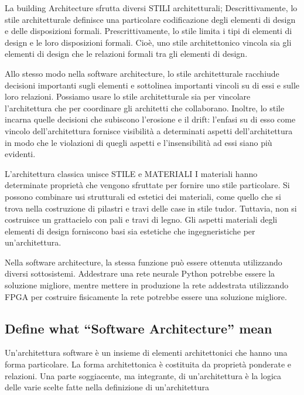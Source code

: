 \documentclass{article}
\begin{document}
La building Architecture sfrutta diversi STILI architetturali;
Descrittivamente, lo stile architetturale definisce una particolare codificazione degli elementi di design e delle disposizioni formali.
Prescrittivamente, lo stile limita i tipi di elementi di design e le loro disposizioni formali.
Cioè, uno stile architettonico vincola sia gli elementi di design che le relazioni formali tra gli elementi di design.

Allo stesso modo nella software architecture, lo stile architetturale racchiude decisioni importanti sugli elementi e sottolinea importanti vincoli su di essi e sulle loro relazioni.
Possiamo usare lo stile architetturale sia per vincolare l'architettura che per coordinare gli architetti che collaborano.
Inoltre, lo stile incarna quelle decisioni che subiscono l'erosione e il drift: l'enfasi su di esso come vincolo dell'architettura fornisce visibilità a determinati aspetti dell'architettura in modo che le violazioni di quegli aspetti e l'insensibilità ad essi siano più evidenti.

L'architettura classica unisce STILE e MATERIALI
I materiali hanno determinate proprietà che vengono sfruttate per fornire uno stile particolare. Si possono combinare usi strutturali ed estetici dei materiali, come quello che si trova nella costruzione di pilastri e travi delle case in stile tudor.
Tuttavia, non si costruisce un grattacielo con pali e travi di legno.
Gli aspetti materiali degli elementi di design forniscono basi sia estetiche che ingegneristiche per un'architettura.

Nella software architecture, la stessa funzione può essere ottenuta utilizzando diversi sottosistemi.
Addestrare una rete neurale Python potrebbe essere la soluzione migliore, mentre mettere in produzione la rete addestrata utilizzando FPGA per costruire fisicamente la rete potrebbe essere una soluzione migliore.

\subsection{Define what “Software Architecture” mean}
Un'architettura software è un insieme di elementi architettonici che hanno una forma particolare.
La forma architettonica è costituita da proprietà ponderate e
relazioni.
Una parte soggiacente, ma integrante, di un'architettura è la logica delle varie scelte fatte nella definizione di un'architettura
\end{document}
